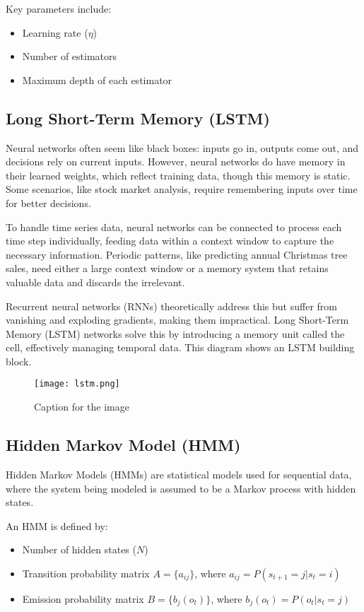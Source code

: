 Key parameters include:
\begin{itemize}
    \item Learning rate ($\eta$)
    \item Number of estimators
    \item Maximum depth of each estimator
\end{itemize}

\subsection{Long Short-Term Memory (LSTM)}

Neural networks often seem like black boxes: inputs go in, outputs come out, and decisions rely on current inputs. However, neural networks do have memory in their learned weights, 
which reflect training data, though this memory is static. Some scenarios, like stock market analysis, require remembering inputs over time for better decisions.

To handle time series data, neural networks can be connected to process each time step individually, feeding data within a context window to capture the necessary information. 
Periodic patterns, like predicting annual Christmas tree sales, need either a large context window or a memory system that retains valuable data and discards the irrelevant.

Recurrent neural networks (RNNs) theoretically address this but suffer from vanishing and exploding gradients, making them impractical. 
Long Short-Term Memory (LSTM) networks solve this by introducing a memory unit called the cell, effectively managing temporal data. 
This diagram shows an LSTM building block.

\begin{figure}[h]
    \centering
    \texttt{[image: lstm.png]}
    \caption{Caption for the image}
    \label{fig:example-image}
\end{figure}



\subsection{Hidden Markov Model (HMM)}

Hidden Markov Models (HMMs) are statistical models used for sequential data, where the system being modeled is assumed to be a Markov process with hidden states.

An HMM is defined by:
\begin{itemize}
    \item Number of hidden states ($N$)
    \item Transition probability matrix $A = \{a_{ij}\}$, where $a_{ij} = P(s_{t+1}=j | s_t=i)$
    \item Emission probability matrix $B = \{b_j(o_t)\}$, where $b_j(o_t) = P(o_t | s_t=j)$
\end{itemize}

